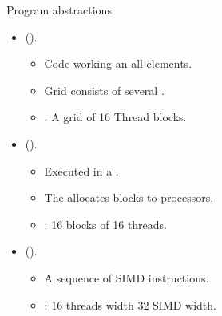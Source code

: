 \begin{frame}[t]{Program abstractions}
\begin{itemize}
  \item {} ().
    \begin{itemize}
      \item Code working an all elements.
      \item Grid consists of several .
      \item {}: A grid of 16 Thread blocks.
    \end{itemize}

  \item {} ().
    \begin{itemize}
      \item Executed in a .
      \item The  allocates blocks to processors.
      \item {}: 16 blocks of 16 threads.
    \end{itemize}

  \item {} ().
    \begin{itemize}
      \item A sequence of SIMD instructions.
      \item {}: 16 threads width 32 SIMD width.
    \end{itemize}
\end{itemize}
\end{frame}


